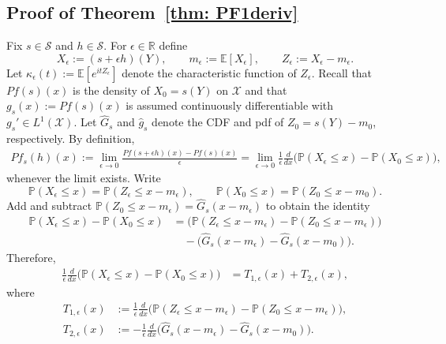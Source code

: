 \documentclass[12pt,leqno]{amsart}
\begin{document}
\subsection{Proof of Theorem~\ref{thm: PF1deriv}}
Fix $s\in\mathcal{S}$ and $h\in\mathcal{S}$. For $\epsilon\in\mathbb R$ define
\[
X_\epsilon:=(s+\epsilon h)(Y),\qquad m_\epsilon:=\mathbb E[X_\epsilon],
\qquad Z_\epsilon:=X_\epsilon-m_\epsilon.
\]
Let $\kappa_\epsilon(t):=\mathbb E[e^{itZ_\epsilon}]$ denote the characteristic function of $Z_\epsilon$.
Recall that $Pf(s)(x)$ is the density of $X_0=s(Y)$ on $\mathcal{X}$ and that $g_s(x):=Pf(s)(x)$ is assumed
continuously differentiable with $g_s'\in L^1(\mathcal{X})$.
Let $\hat G_s$ and $\hat g_s$ denote the CDF and pdf of $Z_0=s(Y)-m_0$, respectively.
By definition,
\begin{align*}
Pf_s(h)(x)
:=\lim_{\epsilon\to 0}\frac{Pf(s+\epsilon h)(x)-Pf(s)(x)}{\epsilon}
=\lim_{\epsilon\to 0}\frac{1}{\epsilon}\frac{d}{dx}\Big(\mathbb P(X_\epsilon\le x)-\mathbb P(X_0\le x)\Big),
\end{align*}
whenever the limit exists.
Write
\[
\mathbb P(X_\epsilon\le x)=\mathbb P(Z_\epsilon\le x-m_\epsilon),
\qquad
\mathbb P(X_0\le x)=\mathbb P(Z_0\le x-m_0).
\]
Add and subtract $\mathbb P(Z_0\le x-m_\epsilon)=\hat G_s(x-m_\epsilon)$ to obtain the identity
\begin{align*}
\mathbb P(X_\epsilon\le x)-\mathbb P(X_0\le x)
&=\Big(\mathbb P(Z_\epsilon\le x-m_\epsilon)-\mathbb P(Z_0\le x-m_\epsilon)\Big)\\
&\quad-\Big(\hat G_s(x-m_\epsilon)-\hat G_s(x-m_0)\Big).
\end{align*}
Therefore,
\begin{align}\label{eq:split_two_terms}
\frac{1}{\epsilon}\frac{d}{dx}\Big(\mathbb P(X_\epsilon\le x)-\mathbb P(X_0\le x)\Big)
&=
T_{1,\epsilon}(x)+T_{2,\epsilon}(x),
\end{align}
where
\begin{align*}
T_{1,\epsilon}(x)
&:=
\frac{1}{\epsilon}\frac{d}{dx}\Big(\mathbb P(Z_\epsilon\le x-m_\epsilon)-\mathbb P(Z_0\le x-m_\epsilon)\Big),\\
T_{2,\epsilon}(x)
&:=
-\frac{1}{\epsilon}\frac{d}{dx}\Big(\hat G_s(x-m_\epsilon)-\hat G_s(x-m_0)\Big).
\end{align*}
\end{document}
